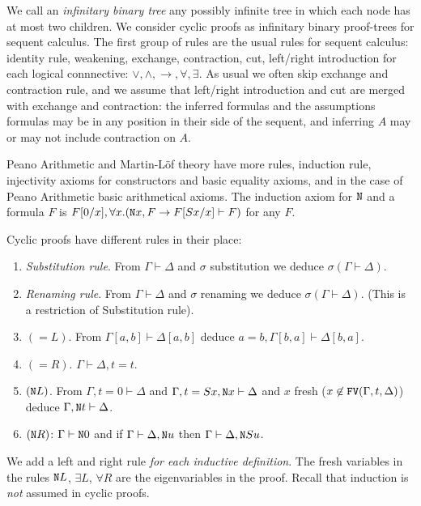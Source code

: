 \documentclass[a4paper,12pt]{article}
\newcommand{\Nat}               { {\tt N}  }
\newcommand{\FV}              { {\tt FV} }
\newcommand{\eqL}     {= \! \!  \!  L}
\newcommand{\eqR}    {= \! \!  \!  R}
\begin{document}
We call an \emph{infinitary binary tree} any possibly infinite tree in which each node has at most two children. We consider cyclic proofs as infinitary binary proof-trees for sequent calculus. The first group of rules are the usual rules for sequent calculus: identity rule, weakening, exchange, contraction, cut, left/right introduction for each logical connnective: $\vee, \wedge, \rightarrow, \forall, \exists$. As usual we often skip exchange and contraction rule, and we assume that left/right introduction and cut are merged with exchange and contraction: the inferred formulas and the assumptions formulas may be in any position in their side of the sequent, and inferring $A$ may or may not include contraction on $A$. 

Peano Arithmetic and Martin-L\"{o}f theory have more rules, induction rule, injectivity axioms for constructors and basic equality axioms, and in the case of Peano Arithmetic basic arithmetical axioms. The induction axiom for $\Nat$ and a formula $F$ is $F[0/x], \forall x. (\Nat x, F \rightarrow F[Sx/x] \vdash F)$ for any $F$. 

Cyclic proofs have different rules in their place:
\begin{enumerate}
\item 
\emph{Substitution rule}. From $\Gamma \vdash \Delta$ and $\sigma$ substitution we deduce $\sigma(\Gamma \vdash \Delta)$. 
\item
\emph{Renaming rule}.  From $\Gamma \vdash \Delta$ and $\sigma$ renaming we deduce $\sigma(\Gamma \vdash \Delta)$. (This is a restriction of Substitution rule).
\item
$(\eqL)$.  From $\Gamma[a,b] \vdash \Delta[a,b]$ deduce $a=b,\Gamma[b,a] \vdash \Delta[b,a]$. 
\item
$(\eqR)$. $\Gamma \vdash \Delta, t=t$.
\item 
$(\Nat L)$. From $\Gamma, t=0 \vdash \Delta$ and $\Gamma, t=Sx, \Nat x \vdash \Delta$ and $x$ fresh ($x \not \in \FV(\Gamma, t, \Delta)$) deduce $\Gamma, \Nat t \vdash \Delta$.
\item
$(\Nat R)$: $\Gamma \vdash \Nat 0$ and if $\Gamma \vdash \Delta, \Nat u$ then $\Gamma \vdash \Delta, \Nat S u$. 
\end{enumerate}
We add a left and right rule \emph{for each inductive definition}. The fresh variables in the rules $\Nat L$, $\exists L$, $\forall R$ are the eigenvariables in the proof.  Recall that induction is \emph{not} assumed in cyclic proofs. 
\end{document}
